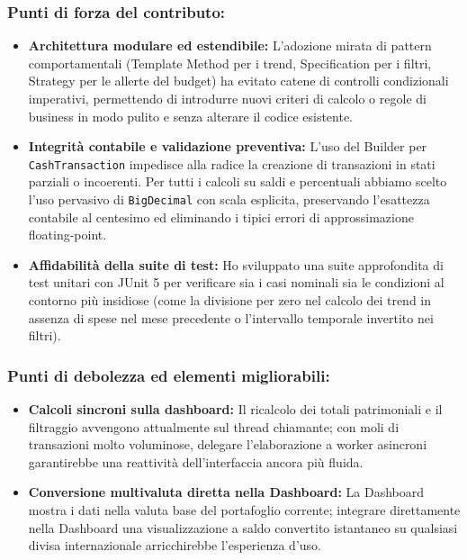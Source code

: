 \documentclass[11pt,a4paper,openright]{report}
\begin{document}
\subsubsection*{Punti di forza del contributo:}
\begin{itemize}
  \item \textbf{Architettura modulare ed estendibile:} L'adozione mirata di pattern comportamentali (Template Method per i trend, Specification per i filtri, Strategy per le allerte del budget) ha evitato catene di controlli condizionali imperativi, permettendo di introdurre nuovi criteri di calcolo o regole di business in modo pulito e senza alterare il codice esistente.
  \item \textbf{Integrità contabile e validazione preventiva:} L'uso del Builder per \texttt{CashTransaction} impedisce alla radice la creazione di transazioni in stati parziali o incoerenti. Per tutti i calcoli su saldi e percentuali abbiamo scelto l'uso pervasivo di \texttt{BigDecimal} con scala esplicita, preservando l'esattezza contabile al centesimo ed eliminando i tipici errori di approssimazione floating-point.
  \item \textbf{Affidabilità della suite di test:} Ho sviluppato una suite approfondita di test unitari con JUnit 5 per verificare sia i casi nominali sia le condizioni al contorno più insidiose (come la divisione per zero nel calcolo dei trend in assenza di spese nel mese precedente o l'intervallo temporale invertito nei filtri).
\end{itemize}

\subsubsection*{Punti di debolezza ed elementi migliorabili:}
\begin{itemize}
  \item \textbf{Calcoli sincroni sulla dashboard:} Il ricalcolo dei totali patrimoniali e il filtraggio avvengono attualmente sul thread chiamante; con moli di transazioni molto voluminose, delegare l'elaborazione a worker asincroni garantirebbe una reattività dell'interfaccia ancora più fluida.
  \item \textbf{Conversione multivaluta diretta nella Dashboard:} La Dashboard mostra i dati nella valuta base del portafoglio corrente; integrare direttamente nella Dashboard una visualizzazione a saldo convertito istantaneo su qualsiasi divisa internazionale arricchirebbe l'esperienza d'uso.
\end{itemize}
\end{document}
